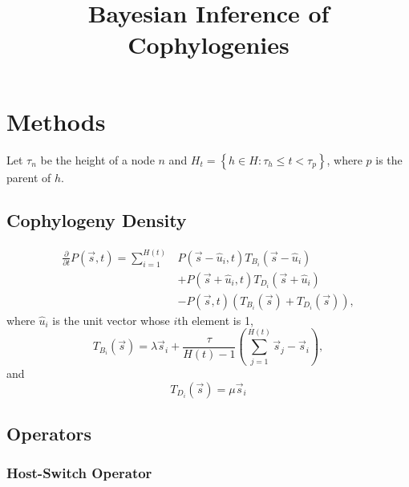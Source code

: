 \documentclass{article}
\title{Bayesian Inference of Cophylogenies}
\begin{document}
    \section*{Methods}
       
        Let $\tau_n$ be the height of a node $n$ and $H_t = \left\{h \in H: 
        \tau_h \leq t < \tau_p\right\}$, where $p$ is the parent of $h$.

        \subsection*{Cophylogeny Density}
        
            \begin{equation}
                \begin{split}
                    \frac{\partial}{\partial t} P\left(\vec{s},t\right) = 
                    \sum_{i=1}^{H\left(t\right)} &P\left(\vec{s} - \hat{u}_i, 
                    t\right)T_{B_i}\left(\vec{s} - \hat{u}_i\right) \\ &+ 
                    P\left(\vec{s} + \hat{u}_i, t\right)T_{D_i}\left(\vec{s} + 
                    \hat{u}_i \right) \\ &- P\left(\vec{s}, 
                    t\right)\left(T_{B_i}\left(\vec{s}\right) + 
                    T_{D_i}\left(\vec{s} \right)\right),
                \end{split}
            \end{equation}
            where $\hat{u}_i$ is the unit vector whose $i$th element is 1,
            \begin{equation}
                T_{B_i}\left(\vec{s}\right) = \lambda \vec{s}_i + 
                \frac{\tau}{H\left(t\right) - 1} 
                \left(\sum_{j=1}^{H\left(t\right)}{\vec{s}_j}-\vec{s}_i\right),
            \end{equation}
            and
            \begin{equation}
                T_{D_i}\left(\vec{s}\right) = \mu \vec{s}_i
            \end{equation}

        \subsection*{Operators}
            
            \subsubsection*{Host-Switch Operator}
                
\end{document}
